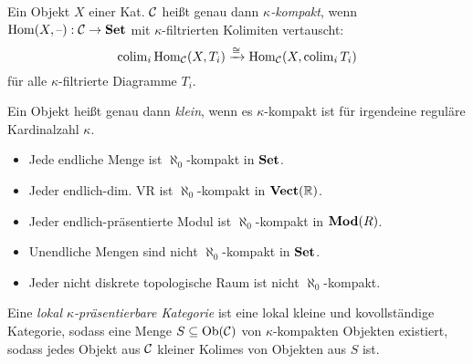 \documentclass{cheat-sheet}
\begin{document}
\begin{defn}
  Ein Objekt $X$ einer Kat. $\mathcal{C}$ heißt genau dann \emph{$\kappa$-kompakt}, wenn $\operatorname{Hom}(X, \text{--}) : \mathcal{C} \to \mathbf{Set}$ mit $\kappa$-filtrierten Kolimiten vertauscht:
  \[
    \operatorname{colim}_i \operatorname{Hom}_{\mathcal{C}}(X, T_i) \xrightarrow{\cong} \operatorname{Hom}_{\mathcal{C}}(X, \operatorname{colim}_i T_i)
  \]
  für alle $\kappa$-filtrierte Diagramme $T_i$.
\end{defn}

\begin{defn}
  Ein Objekt heißt genau dann \emph{klein}, wenn es $\kappa$-kompakt ist für irgendeine reguläre Kardinalzahl $\kappa$.
\end{defn}

\iffalse
\begin{idee}
  Sei $X$ eine endliche Menge. Sei $X \subset \cup_{i \in \N} T_i$, $T_i \subseteq T_{i+1}$. Dann liegt $X$ schon vollständig in einem der $T_i$.
\end{idee}
\fi

\begin{bsp}
  \begin{itemize}
    \item Jede endliche Menge ist $\aleph_0$-kompakt in $\mathbf{Set}$.
    \item Jeder endlich-dim. VR ist $\aleph_0$-kompakt in $\mathbf{Vect}(\mathbb{R})$.
    \item Jeder endlich-präsentierte Modul ist $\aleph_0$-kompakt in $\mathbf{Mod}(R)$.
    \item Unendliche Mengen sind nicht $\aleph_0$-kompakt in $\mathbf{Set}$.
    \item Jeder nicht diskrete topologische Raum ist nicht $\aleph_0$-kompakt.
  \end{itemize}
\end{bsp}

\begin{defn}
  Eine \emph{lokal $\kappa$-präsentierbare Kategorie} ist eine lokal kleine und kovollständige Kategorie, sodass eine Menge $S \subseteq \operatorname{Ob}(\mathcal{C})$ von $\kappa$-kompakten Objekten existiert, sodass jedes Objekt aus $\mathcal{C}$ kleiner Kolimes von Objekten aus $S$ ist.
\end{defn}


\pagebreak

\end{document}
